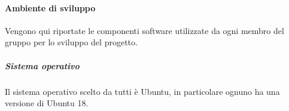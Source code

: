 	    \paragraph{Ambiente di sviluppo}\label{PP:Sviluppo:Strumenti:AmbienteSviluppo}
	    Vengono qui riportate le componenti software utilizzate da ogni membro del gruppo per lo sviluppo del progetto.


	    \subparagraph{Sistema operativo}\label{PP:Sviluppo:Strumenti:AmbienteSviluppo:SistemaOperativo}
	    Il sistema operativo scelto da tutti è Ubuntu, in particolare ognuno ha una versione di Ubuntu 18.




